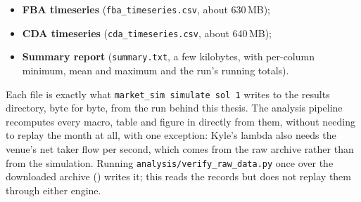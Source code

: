 \begin{itemize}
  \item \textbf{FBA timeseries} (\texttt{fba\_timeseries.csv}, about 630\,MB);
  \item \textbf{CDA timeseries} (\texttt{cda\_timeseries.csv}, about 640\,MB);
  \item \textbf{Summary report} (\texttt{summary.txt}, a few kilobytes,
  with per-column minimum, mean and maximum and the run's running totals).
\end{itemize}

Each file is exactly what \texttt{market\_sim simulate sol 1} writes to the
results directory, byte for byte, from the run behind this thesis. The analysis
pipeline recomputes every macro, table and figure in  directly
from them, without needing to replay the month at all, with one exception:
Kyle's lambda also needs the venue's net taker flow per second, which comes
from the raw archive rather than from the simulation. Running
\texttt{analysis/verify\_raw\_data.py} once over the downloaded archive
() writes it; this reads the records but does not replay
them through either engine.
